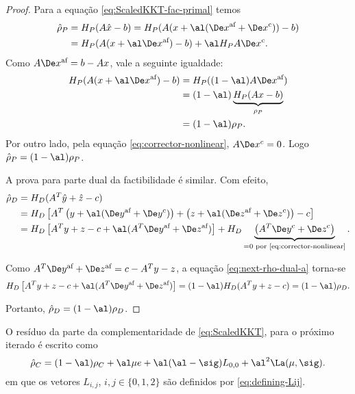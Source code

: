 \begin{proof}
Para a equação \eqref{eq:ScaledKKT-fac-primal} temos
\[
\begin{aligned}
\hat{\rho}_P & = H_P(A\hat{x} -b) = H_P(A(x + \al(\dex +
\Decox )) -b) \\ 
			& = H_P(A(x +  \al\dex) - b) +
 \al H_PA\Decox.
\end{aligned}
\]
Como $A\dex = b- Ax$, vale a seguinte igualdade:
\[
\begin{aligned}
H_P(A(x +  \al\dex) - b) & = H_P((1-\al)A\dex) \\
							& =  (1 - \al)\underbrace{H_P(Ax - b)}_{\rho_P} 	\\
							& = (1 - \al)\rho_P.					
\end{aligned}
\]
Por outro lado, pela equação \eqref{eq:corrector-nonlinear}, $A\Dex^c= 0$. Logo
$\hat{\rho}_P = (1-\al)\rho_P$.

A prova para parte dual da factibilidade é similar. Com efeito,
\begin{align}
\hat{\rho}_D & = H_D(A^T\hat{y} + \hat{z} -c)   \notag \\
			& = H_D\left[ A^T\left(y + \al(\dey + \Decoy)\right) + \left(z + \al(\dez + \Decoz )\right)
			-c\right] \notag\\
 			& = H_D\left[A^Ty  + z -c +  \al(A^T\dey + \dez)\right] +
 			\label{eq:next-rho-dual-a} %
 			H_D\underbrace{\left(A^T\Decoy   + \Decoz\right)}_{=0 \text{ por
 			\eqref{eq:corrector-nonlinear}}}. %
\end{align}


Como $A^T\dey + \dez = c - A^Ty - z$, a equação \eqref{eq:next-rho-dual-a}
torna-se
\[
H_D\left[A^Ty  + z -c +  \al(A^T\dey + \dez)\right]  = (1-\al)H_D 
(A^Ty + z - c)  = (1-\al)\rho_D.
\]

Portanto, $ \hat{\rho}_D = (1-\al)\rho_D$.
\end{proof}
 
 
\begin{lema}\label{lemma:nonlinear-residual}
O resíduo da parte da complementaridade de  \eqref{eq:ScaledKKT}, para o próximo iterado é
escrito como
\begin{equation}
\label{eq:next-residual-complementar}
\hat{\rho}_C = (1-\al)\rho_C + \al\mu e+ \al(\al-\sig)L_{0,0} +
\al^2\La(\mu,\sig).
\end{equation}
em que os vetores $L_{i,j}$, $i,j \in \{0,1,2\}$ são definidos por
\eqref{eq:defining-Lij}.
\end{lema}

